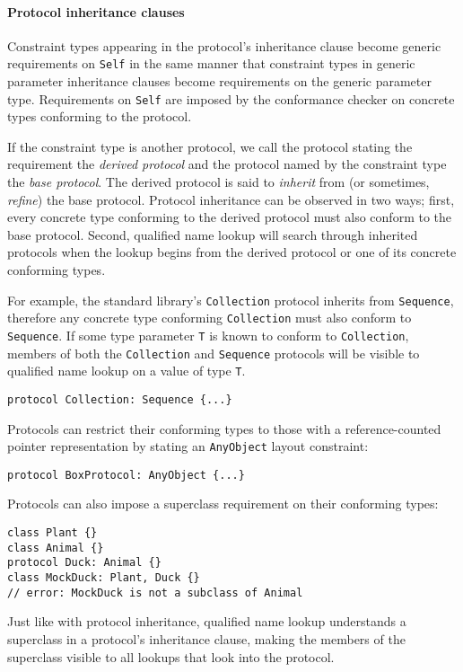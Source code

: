 \documentclass[a4paper,headsepline,bibliography=totoc,toc=flat,fleqn,twoside=semi]{scrbook}
\theoremstyle{definition}
\theoremstyle{definition}
\theoremstyle{definition}
\begin{document}
\paragraph{Protocol inheritance clauses}
Constraint types appearing in the protocol's inheritance clause become generic requirements on \texttt{Self} in the same manner that constraint types in generic parameter inheritance clauses become requirements on the generic parameter type. Requirements on \texttt{Self} are imposed by the conformance checker on concrete types conforming to the protocol.

If the constraint type is another protocol, we call the protocol stating the requirement the \emph{derived protocol} and the protocol named by the constraint type the \emph{base protocol}. The derived protocol is said to \emph{inherit} from (or sometimes, \emph{refine}) the base protocol. Protocol inheritance can be observed in two ways; first, every concrete type conforming to the derived protocol must also conform to the base protocol. Second, qualified name lookup will search through inherited protocols when the lookup begins from the derived protocol or one of its concrete conforming types. 

For example, the standard library's \texttt{Collection} protocol inherits from \texttt{Sequence}, therefore any concrete type conforming \texttt{Collection} must also conform to \texttt{Sequence}. If some type parameter \texttt{T} is known to conform to \texttt{Collection}, members of both the \texttt{Collection} and \texttt{Sequence} protocols will be visible to qualified name lookup on a value of type \texttt{T}.
\begin{Verbatim}
protocol Collection: Sequence {...}
\end{Verbatim}
Protocols can restrict their conforming types to those with a reference-counted pointer representation by stating an \texttt{AnyObject} layout constraint:
\begin{Verbatim}
protocol BoxProtocol: AnyObject {...}
\end{Verbatim}
Protocols can also impose a superclass requirement on their conforming types:
\begin{Verbatim}
class Plant {}
class Animal {}
protocol Duck: Animal {}
class MockDuck: Plant, Duck {}
// error: MockDuck is not a subclass of Animal
\end{Verbatim}
Just like with protocol inheritance, qualified name lookup understands a superclass in a protocol's inheritance clause, making the members of the superclass visible to all lookups that look into the protocol.
\end{document}
